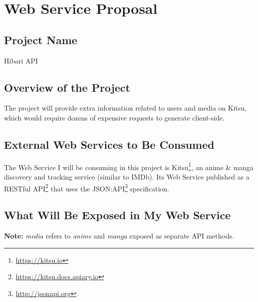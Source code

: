 \chapter{Web Service Proposal}
\section{Project Name}

Hibari API

\section{Overview of the Project}

The project will provide extra information  related to users and media on Kitsu, which would require dozens of expensive requests to generate client-side.

\section{External Web Services to Be Consumed}

The Web Service I will be consuming in this project is Kitsu\footnote{\url{https://kitsu.io}}, an anime \& manga discovery and tracking service (similar to IMDb). Its Web Service published as a RESTful API\footnote{\url{https://kitsu.docs.apiary.io}} that uses the JSON:API\footnote{\url{http://jsonapi.org}} specification.

\section{What Will Be Exposed in My Web Service}

\textbf{Note:} \textit{media} refers to \textit{anime} and \textit{manga} exposed as separate API methods.


